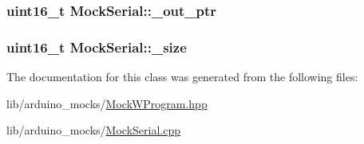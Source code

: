 \hypertarget{class_mock_serial_a0d4616ef10a3e6dbac58922ef972a448}{
\subsubsection[{\-\_\-out\-\_\-ptr}]{\setlength{\rightskip}{0pt plus 5cm}uint16\-\_\-t Mock\-Serial\-::\-\_\-out\-\_\-ptr}}\label{class_mock_serial_a0d4616ef10a3e6dbac58922ef972a448}
\hypertarget{class_mock_serial_a2a26571f236f963d4d1e87cc17d75bda}{
\subsubsection[{\-\_\-size}]{\setlength{\rightskip}{0pt plus 5cm}uint16\-\_\-t Mock\-Serial\-::\-\_\-size}}\label{class_mock_serial_a2a26571f236f963d4d1e87cc17d75bda}


The documentation for this class was generated from the following files\-:\begin{DoxyCompactItemize}
\item 
lib/arduino\-\_\-mocks/\hyperlink{_mock_w_program_8hpp}{Mock\-W\-Program.\-hpp}\item 
lib/arduino\-\_\-mocks/\hyperlink{_mock_serial_8cpp}{Mock\-Serial.\-cpp}\end{DoxyCompactItemize}
